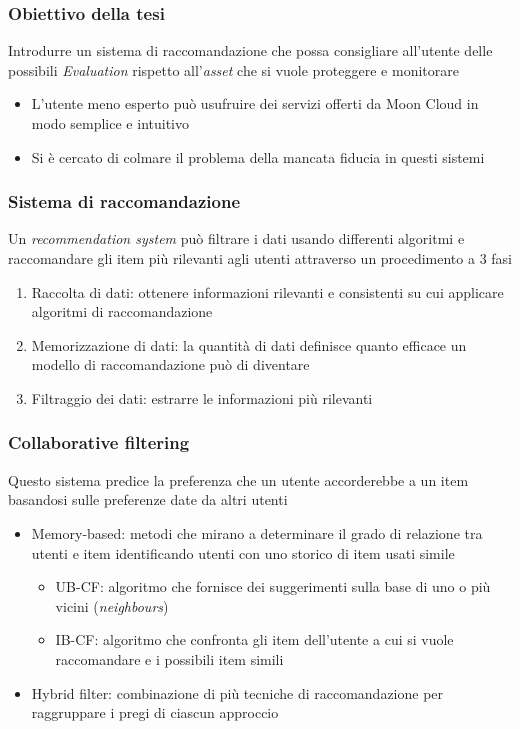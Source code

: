 \begin{frame}
    \frametitle{Obiettivo della tesi}
    Introdurre un \alert{sistema di raccomandazione} che possa consigliare all'utente delle possibili \textit{Evaluation} rispetto 
    all'\textit{asset} che si vuole proteggere e monitorare
    \begin{itemize}
        \item L'utente meno esperto può usufruire dei servizi offerti da Moon Cloud in modo \alert{semplice} e \alert{intuitivo}
        \item Si è cercato di colmare il problema della mancata fiducia in questi sistemi
    \end{itemize}
\end{frame}

\begin{frame}
    \frametitle{Sistema di raccomandazione}
    Un \textit{recommendation system} può filtrare i dati usando differenti algoritmi e raccomandare gli item più rilevanti agli utenti attraverso 
    un procedimento a 3 fasi
    \begin{enumerate}
        \item \alert{Raccolta di dati}: ottenere informazioni rilevanti e consistenti su cui applicare algoritmi di raccomandazione
        \item \alert{Memorizzazione di dati}: la quantità di dati definisce quanto efficace un modello di raccomandazione può di diventare
        \item \alert{Filtraggio dei dati}: estrarre le informazioni più rilevanti
    \end{enumerate}
\end{frame}

\begin{frame}
    \frametitle{Collaborative filtering}
    Questo sistema predice la preferenza che un utente accorderebbe a un item basandosi sulle preferenze date da altri utenti
    \begin{itemize}
        \item Memory-based: metodi che mirano a determinare il grado di relazione tra utenti e item identificando 
        utenti con uno storico di item usati simile
            \begin{itemize}
                \item \alert{UB-CF}: algoritmo che fornisce dei suggerimenti sulla base di uno o più vicini (\textit{neighbours})
                \item \alert{IB-CF}: algoritmo che confronta gli item dell'utente a cui si vuole raccomandare e i possibili item simili
            \end{itemize}
        \item Hybrid filter: combinazione di più tecniche di raccomandazione per raggruppare i pregi di ciascun approccio
    \end{itemize}
\end{frame}

